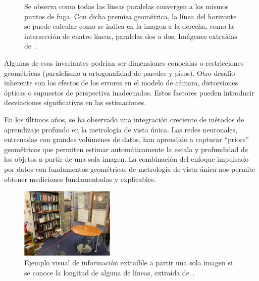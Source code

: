 \begin{figure}[htp]
\begin{center}
\end{center}
\caption{Se observa como todas las líneas paralelas convergen a los mismos puntos de fuga.
Con dicha premisa geométrica,
la línea del horizonte se puede calcular como se indica en la imagen a la derecha, como la intersección de cuatro líneas, paralelas dos a dos.
Imágenes extraídas de~\cite{VisionBookMIT}.
}
\label{fig:PalmaHorizon}
\end{figure}

Algunas de esas invariantes podrían ser dimensiones conocidas o restricciones geométricas (paralelismo u ortogonalidad de paredes y pisos).
Otro desafío inherente son los efectos de los errores en el modelo de cámara, distorsiones ópticas o supuestos de perspectiva inadecuados.
Estos factores pueden introducir desviaciones significativas en las estimaciones.
\par
En los últimos años, se ha observado una integración creciente de métodos de aprendizaje profundo en la metrología de vista única.
Las redes neuronales, entrenadas con grandes volúmenes de datos, han aprendido a capturar ``priors'' geométricos que permiten
estimar automáticamente la escala y profundidad de los objetos a partir de una sola imagen. La combinación del enfoque
impulsado por datos con fundamentos geométricas de metrología de vista única nos permite obtener mediciones fundamentadas y explicables.

\begin{figure}[htp]
\begin{center}
    \includegraphics[width=0.4\textwidth]{imagenes/chapter2/office-measurements}
\end{center}
\caption{Ejemplo visual de información extraíble a partir una sola imagen si se conoce la longitud de alguna de líneas, extraída de~\cite{VisionBookMIT}.
}
\label{fig:OfficeMeasurements}
\end{figure}

